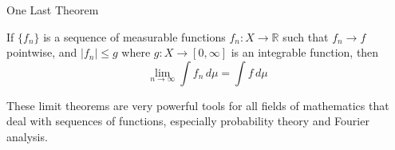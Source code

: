 \documentclass{beamer}
\begin{document}
\begin{frame}{One Last Theorem}
    \begin{theorem}
        If $\{f_n\}$ is a sequence of measurable functions
        $f_n : X \to \mathbb{R}$ such that $f_n \to f$ pointwise,
        and $|f_n| \leq g$ where $g : X \to [0, \infty]$ is an 
        integrable function, then
        \[
            \lim_{n\to\infty}\int f_n\,d\mu = \int f\,d\mu      
        \]
    \end{theorem}

    These limit theorems are very powerful tools for all fields of mathematics
    that deal with sequences of functions, especially probability theory and
    Fourier analysis.
\end{frame}
\end{document}
